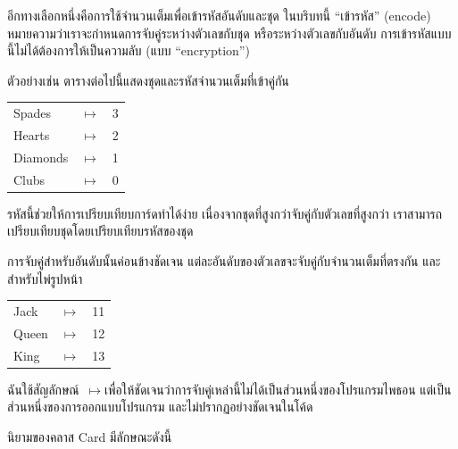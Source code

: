 อีกทางเลือกหนึ่งคือการใช้จำนวนเต็มเพื่อเข้ารหัสอันดับและชุด ในบริบทนี้ ``เข้ารหัส'' (encode) หมายความว่าเราจะกำหนดการจับคู่ระหว่างตัวเลขกับชุด หรือระหว่างตัวเลขกับอันดับ
การเข้ารหัสแบบนี้ไม่ได้ต้องการให้เป็นความลับ (แบบ  ``encryption'')

\newcommand{\mymapsto}{$\mapsto$}

ตัวอย่างเช่น ตารางต่อไปนี้แสดงชุดและรหัสจำนวนเต็มที่เข้าคู่กัน

\begin{tabular}{l c l}
Spades & \mymapsto & 3 \\
Hearts & \mymapsto & 2 \\
Diamonds & \mymapsto & 1 \\
Clubs & \mymapsto & 0
\end{tabular}


รหัสนี้ช่วยให้การเปรียบเทียบการ์ดทำได้ง่าย เนื่องจากชุดที่สูงกว่าจับคู่กับตัวเลขที่สูงกว่า เราสามารถเปรียบเทียบชุดโดยเปรียบเทียบรหัสของชุด


การจับคู่สำหรับอันดับนั้นค่อนข้างชัดเจน แต่ละอันดับของตัวเลขจะจับคู่กับจำนวนเต็มที่ตรงกัน และสำหรับไพ่รูปหน้า

\begin{tabular}{l c l}
Jack & \mymapsto & 11 \\
Queen & \mymapsto & 12 \\
King & \mymapsto & 13 \\
\end{tabular}


ฉันใช้สัญลักษณ์~\mymapsto เพื่อให้ชัดเจนว่าการจับคู่เหล่านี้ไม่ได้เป็นส่วนหนึ่งของโปรแกรมไพธอน แต่เป็นส่วนหนึ่งของการออกแบบโปรแกรม และไม่ปรากฏอย่างชัดเจนในโค้ด


นิยามของคลาส Card มีลักษณะดังนี้

